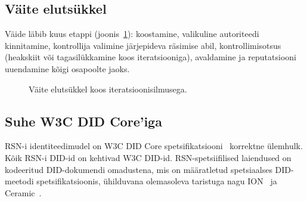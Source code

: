 \documentclass[11pt,a4paper,twocolumn]{article}
\begin{document}
\subsection{Väite elutsükkel}

Väide läbib kuus etappi (joonis~\ref{fig:lifecycle}): koostamine, valikuline autoriteedi kinnitamine, kontrollija valimine järjepideva räsimise abil, kontrollimisotsus (heakskiit või tagasilükkamine koos iteratsiooniga), avaldamine ja reputatsiooni uuendamine kõigi osapoolte jaoks.

\begin{figure}[ht]
\centering
{}
\caption{Väite elutsükkel koos iteratsioonisilmusega.}
\label{fig:lifecycle}
\end{figure}

\subsection{Suhe W3C DID Core'iga}

RSN-i identiteedimudel on W3C DID Core spetsifikatsiooni~\cite{did2022} korrektne ülemhulk. Kõik RSN-i DID-id on kehtivad W3C DID-id. RSN-spetsiifilised laiendused on kodeeritud DID-dokumendi omadustena, mis on määratletud spetsiaalses DID-meetodi spetsifikatsioonis, ühilduvana olemasoleva taristuga nagu ION~\cite{buchner2021} ja Ceramic~\cite{ceramic2023}.

\end{document}
